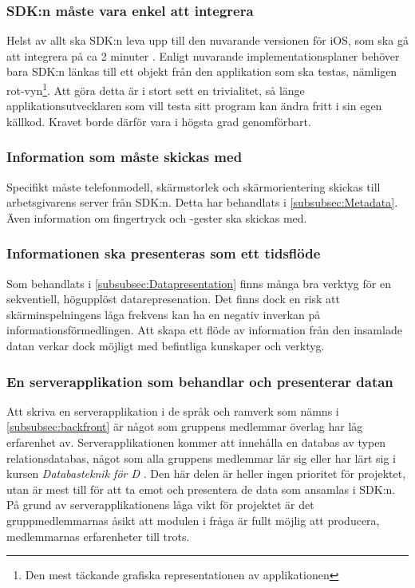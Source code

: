 \subsubsection{SDK:n måste vara enkel att integrera}
Helst av allt ska SDK:n leva upp till den nuvarande versionen för iOS, som ska gå att integrera på ca 2 minuter \parencite{superrec}. Enligt nuvarande implementationsplaner behöver bara SDK:n länkas till ett objekt från den applikation som ska testas, nämligen rot-vyn\footnote{Den mest täckande grafiska representationen av applikationen}. Att göra detta är i stort sett en trivialitet, så länge applikationsutvecklaren som vill testa sitt program kan ändra fritt i sin egen källkod. Kravet borde därför vara i högsta grad genomförbart.

\subsubsection{Information som måste skickas med}
Specifikt måste telefonmodell, skärmstorlek och skärmorientering skickas till arbetsgivarens server från SDK:n. Detta har behandlats i \ref{subsubsec:Metadata}. Även information om fingertryck och -gester ska skickas med. 

\subsubsection{Informationen ska presenteras som ett tidsflöde}
Som behandlats i \ref{subsubsec:Datapresentation} finns många bra verktyg för en sekventiell, högupplöst datarepresenation. Det finns dock en risk att skärminspelningens låga frekvens kan ha en negativ inverkan på informationsförmedlingen. Att skapa ett flöde av information från den insamlade datan verkar dock möjligt med befintliga kunskaper och verktyg.

\subsubsection{En serverapplikation som behandlar och presenterar datan}
Att skriva en serverapplikation i de språk och ramverk som nämns i \ref{subsubsec:backfront} är något som gruppens medlemmar överlag har låg erfarenhet av. Serverapplikationen kommer att innehålla en databas av typen relationsdatabas, något som alla gruppens medlemmar lär sig eller har lärt sig i kursen \textit{Databasteknik för D} \parencite{dbas}. Den här delen är heller ingen prioritet för projektet, utan är mest till för att ta emot och presentera de data som ansamlas i SDK:n. På grund av serverapplikationens låga vikt för projektet är det gruppmedlemmarnas åsikt att modulen i fråga är fullt möjlig att producera, medlemmarnas erfarenheter till trots.

